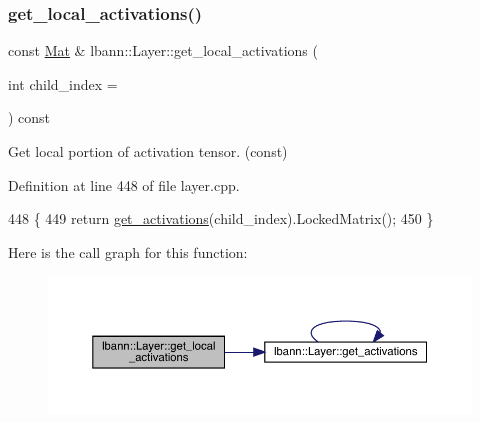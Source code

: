 \mbox{\label{classlbann_1_1Layer_aadbc466c72f455c10b53bf45dca56332}} 
\subsubsection{\texorpdfstring{get\+\_\+local\+\_\+activations()}{get\_local\_activations()}\hspace{0.1cm}{\footnotesize\ttfamily [2/2]}}
{\footnotesize\ttfamily const \hyperlink{base_8hpp_a68f11fdc31b62516cb310831bbe54d73}{Mat} \& lbann\+::\+Layer\+::get\+\_\+local\+\_\+activations (\begin{DoxyParamCaption}\item[{int}]{child\+\_\+index = {} }\end{DoxyParamCaption}) const}

Get local portion of activation tensor. (const) 

Definition at line 448 of file layer.\+cpp.


\begin{DoxyCode}
448                                                              \{
449   \textcolor{keywordflow}{return} \hyperlink{classlbann_1_1Layer_a1134b1a4385af199d7272c5aa827fa99}{get\_activations}(child\_index).LockedMatrix();
450 \}
\end{DoxyCode}
Here is the call graph for this function\+:\nopagebreak
\begin{figure}[H]
\begin{center}
\leavevmode
\includegraphics[width=350pt]{classlbann_1_1Layer_aadbc466c72f455c10b53bf45dca56332_cgraph}
\end{center}
\end{figure}
\mbox{\label{classlbann_1_1Layer_af178d00b9d878aa7d87754bff2a91f3a}} 
